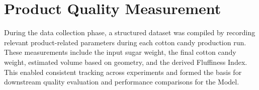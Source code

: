 % 
% 
% 
% 
% 


\section{Product Quality Measurement}

During the data collection phase, a structured dataset was compiled by recording relevant product-related parameters during each cotton candy production run. These measurements include the input sugar weight, the final cotton candy weight, estimated volume based on geometry, and the derived Fluffiness Index. This enabled consistent tracking across experiments and formed the basis for downstream quality evaluation and performance comparisons for the Model.

